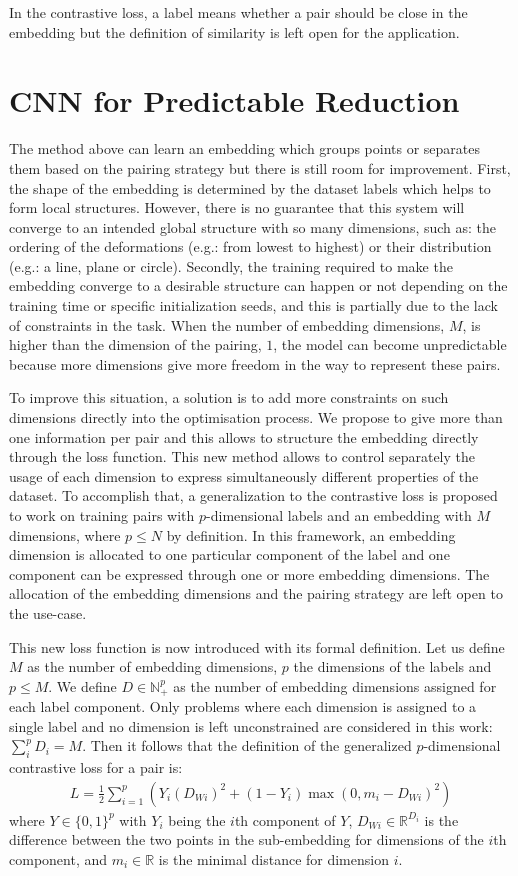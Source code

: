 \documentclass[a4paper,12pt]{report}
\newcommand{\N}{\mathbb{N}}
\newcommand{\R}{\mathbb{R}}
\newcommand{\eg}{e.g.}
\begin{document}
In the contrastive loss, a label means whether a pair should be close in the embedding but the definition of similarity is left open for the application.

\section{CNN for Predictable Reduction}
The method above can learn an embedding which groups points or separates them based on the pairing strategy but there is still room for improvement.
First, the shape of the embedding is determined by the dataset labels which helps to form local structures.
However, there is no guarantee that this system will converge to an intended global structure with so many dimensions, such as: the ordering of the deformations (\eg: from lowest to highest) or their distribution (\eg: a line, plane or circle).
Secondly, the training required to make the embedding converge to a desirable structure can happen or not depending on the training time or specific initialization seeds, and this is partially due to the lack of constraints in the task.
When the number of embedding dimensions, $M$, is higher than the dimension of the pairing, $1$, the model can become unpredictable because more dimensions give more freedom in the way to represent these pairs.

To improve this situation, a solution is to add more constraints on such dimensions directly into the optimisation process.
We propose to give more than one information per pair and this allows to structure the embedding directly through the loss function.
This new method allows to control separately the usage of each dimension to express simultaneously different properties of the dataset.
To accomplish that, a generalization to the contrastive loss is proposed to work on training pairs with $p$-dimensional labels and an embedding with $M$ dimensions, where $p \leq N$ by definition.
In this framework, an embedding dimension is allocated to one particular component of the label and one component can be expressed through one or more embedding dimensions.
The allocation of the embedding dimensions and the pairing strategy are left open to the use-case.

This new loss function is now introduced with its formal definition.
Let us define $M$ as the number of embedding dimensions, $p$ the dimensions of the labels and $p \leq M$.
We define $D \in \N_+^p$ as the number of embedding dimensions assigned for each label component.
Only problems where each dimension is assigned to a single label and no dimension is left unconstrained are considered in this work: $\sum_i^p D_i = M$.
Then it follows that the definition of the generalized $p$-dimensional contrastive loss for a pair is:
\begin{eqnarray}
    L = \frac{1}{2} \sum_{i=1}^p \left( Y_i (D_{Wi})^2 + (1-Y_i) \max(0, m_i - D_{Wi})^2 \right)
\end{eqnarray}
where $Y \in \{0,1\}^p$ with $Y_i$ being the $i$th component of $Y$, $D_{Wi} \in \R^{D_i}$ is the difference between the two points in the sub-embedding for dimensions of the $i$th component, and $m_i \in \R$ is the minimal distance for dimension $i$.
\end{document}
